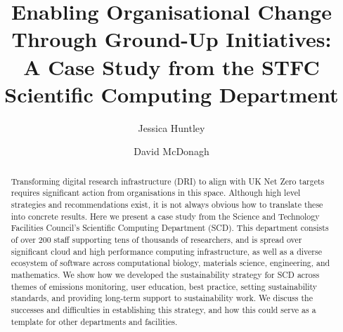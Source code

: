 \documentclass[sigconf]{acmart}
\begin{document}
\title{Enabling Organisational Change Through Ground-Up Initiatives:\\ A Case Study from the STFC Scientific Computing Department}

\author{Jessica Huntley}

\author{David McDonagh}
\authornotemark[1]

\begin{abstract}
  Transforming digital research infrastructure (DRI) to align with UK Net Zero targets requires significant action from organisations in this space. Although high level strategies and recommendations exist, it is not always obvious how to translate these into concrete results. Here we present a case study from the Science and Technology Facilities Council's Scientific Computing Department (SCD). This department consists of over 200 staff supporting tens of thousands of researchers, and is spread over significant cloud and high performance computing infrastructure, as well as a diverse ecosystem of software across computational biology, materials science, engineering, and mathematics. We show how we developed the sustainability strategy for SCD across themes of emissions monitoring, user education, best practice, setting sustainability standards, and providing long-term support to sustainability work. We discuss the successes and difficulties in establishing this strategy, and how this could serve as a template for other departments and facilities.
\end{abstract}

\maketitle
\end{document}

